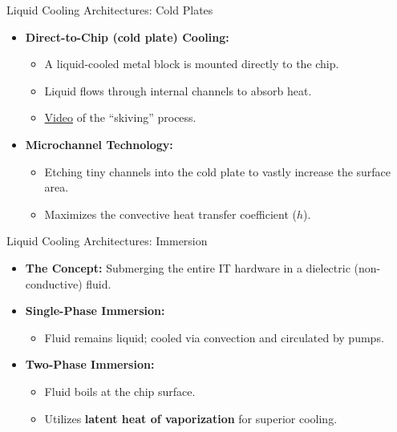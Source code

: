\documentclass[aspectratio=169,10pt,xcolor={table,dvipsnames},t]{beamer}
\begin{document}
	

	\begin{frame}{Liquid Cooling Architectures: Cold Plates}
		\begin{itemize}
			\item \textbf{Direct-to-Chip (cold plate) Cooling:}
			\begin{itemize}
				\item A liquid-cooled metal block is mounted directly to the chip.
				\item Liquid flows through internal channels to absorb heat.
				\item \href{https://www.youtube.com/watch?v=98xtaYz0sy8}{Video} of the ``skiving'' process.
			\end{itemize}
			\item \textbf{Microchannel Technology:}
			\begin{itemize}
				\item Etching tiny channels into the cold plate to vastly increase the surface area.
				\item Maximizes the convective heat transfer coefficient ($h$).
			\end{itemize}
		\end{itemize}
	\end{frame}

	\begin{frame}{Liquid Cooling Architectures: Immersion}
		\begin{itemize}
			\item \textbf{The Concept:} Submerging the entire IT hardware in a dielectric (non-conductive) fluid.
			\item \textbf{Single-Phase Immersion:}
			\begin{itemize}
				\item Fluid remains liquid; cooled via convection and circulated by pumps.
			\end{itemize}
			\item \textbf{Two-Phase Immersion:}
			\begin{itemize}
				\item Fluid boils at the chip surface.
				\item Utilizes \textbf{latent heat of vaporization} for superior cooling.
			\end{itemize}
		\end{itemize}
	\end{frame}
	
\end{document}
